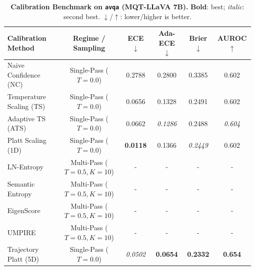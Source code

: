 \begin{table}[t]
\setlength{\tabcolsep}{4pt}
\renewcommand{\arraystretch}{1.05}
\centering
\footnotesize
\begin{tabular}{lccccc}
\toprule
\textbf{Calibration Method} & \textbf{Regime / Sampling} & \textbf{ECE} $\downarrow$ & \textbf{Ada-ECE} $\downarrow$ & \textbf{Brier} $\downarrow$ & \textbf{AUROC} $\uparrow$ \\
\midrule
Naive Confidence (NC) & Single-Pass ($T = 0.0$) & 0.2788 & 0.2800 & 0.3385 & 0.602 \\
Temperature Scaling (TS) & Single-Pass ($T = 0.0$) & 0.0656 & 0.1328 & 0.2491 & 0.602 \\
Adaptive TS (ATS) & Single-Pass ($T = 0.0$) & 0.0662 & \textit{0.1286} & 0.2488 & \textit{0.604} \\
Platt Scaling (1D) & Single-Pass ($T = 0.0$) & \textbf{0.0118} & 0.1366 & \textit{0.2449} & 0.602 \\
LN-Entropy & Multi-Pass ($T = 0.5, K = 10$) & - & - & - & - \\
Semantic Entropy & Multi-Pass ($T = 0.5, K = 10$) & - & - & - & - \\
EigenScore & Multi-Pass ($T = 0.5, K = 10$) & - & - & - & - \\
UMPIRE & Multi-Pass ($T = 0.5, K = 10$) & - & - & - & - \\
Trajectory Platt (5D) & Single-Pass ($T = 0.0$) & \textit{0.0502} & \textbf{0.0654} & \textbf{0.2332} & \textbf{0.654} \\
\bottomrule
\end{tabular}
\caption{\textbf{Calibration Benchmark on \texttt{avqa} (MQT-LLaVA 7B).} \textbf{Bold}: best; \textit{italic}: second best. $\downarrow$/$\uparrow$: lower/higher is better.}
\label{tab:benchmark_mqt_avqa}
\end{table}
